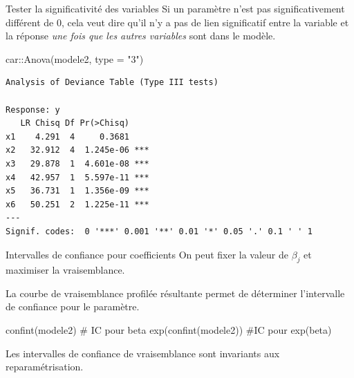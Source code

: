 \documentclass[
  ignorenonframetext,
]{beamer}
\newenvironment{Shaded}{\begin{snugshade}}{\end{snugshade}}
\newcommand{\AttributeTok}[1]{\textcolor[rgb]{0.40,0.45,0.13}{#1}}
\newcommand{\CommentTok}[1]{\textcolor[rgb]{0.37,0.37,0.37}{#1}}
\newcommand{\FunctionTok}[1]{\textcolor[rgb]{0.28,0.35,0.67}{#1}}
\newcommand{\NormalTok}[1]{\textcolor[rgb]{0.00,0.23,0.31}{#1}}
\newcommand{\SpecialCharTok}[1]{\textcolor[rgb]{0.37,0.37,0.37}{#1}}
\newcommand{\StringTok}[1]{\textcolor[rgb]{0.13,0.47,0.30}{#1}}
\begin{document}
\begin{frame}[fragile]{Tester la significativité des variables}
\protect\hypertarget{tester-la-significativituxe9-des-variables}{}
Si un paramètre n'est pas significativement différent de 0, cela veut
dire qu'il n'y a pas de lien significatif entre la variable et la
réponse \emph{une fois que les autres variables} sont dans le modèle.

\footnotesize

\begin{Shaded}
\begin{Highlighting}[numbers=left,,]
\NormalTok{car}\SpecialCharTok{::}\FunctionTok{Anova}\NormalTok{(modele2, }\AttributeTok{type =} \StringTok{"3"}\NormalTok{)}
\end{Highlighting}
\end{Shaded}

\begin{verbatim}
Analysis of Deviance Table (Type III tests)

Response: y
   LR Chisq Df Pr(>Chisq)    
x1    4.291  4     0.3681    
x2   32.912  4  1.245e-06 ***
x3   29.878  1  4.601e-08 ***
x4   42.957  1  5.597e-11 ***
x5   36.731  1  1.356e-09 ***
x6   50.251  2  1.225e-11 ***
---
Signif. codes:  0 '***' 0.001 '**' 0.01 '*' 0.05 '.' 0.1 ' ' 1
\end{verbatim}

\normalsize
\end{frame}

\begin{frame}[fragile]{Intervalles de confiance pour coefficients}
\protect\hypertarget{intervalles-de-confiance-pour-coefficients}{}
On peut fixer la valeur de \(\beta_j\) et maximiser la vraisemblance.

La courbe de vraisemblance profilée résultante permet de déterminer
l'intervalle de confiance pour le paramètre.

\begin{Shaded}
\begin{Highlighting}[numbers=left,,]
\FunctionTok{confint}\NormalTok{(modele2)      }\CommentTok{\# IC pour beta}
\FunctionTok{exp}\NormalTok{(}\FunctionTok{confint}\NormalTok{(modele2)) }\CommentTok{\#IC pour exp(beta)}
\end{Highlighting}
\end{Shaded}

Les intervalles de confiance de vraisemblance sont invariants aux
reparamétrisation.
\end{frame}
\end{document}
